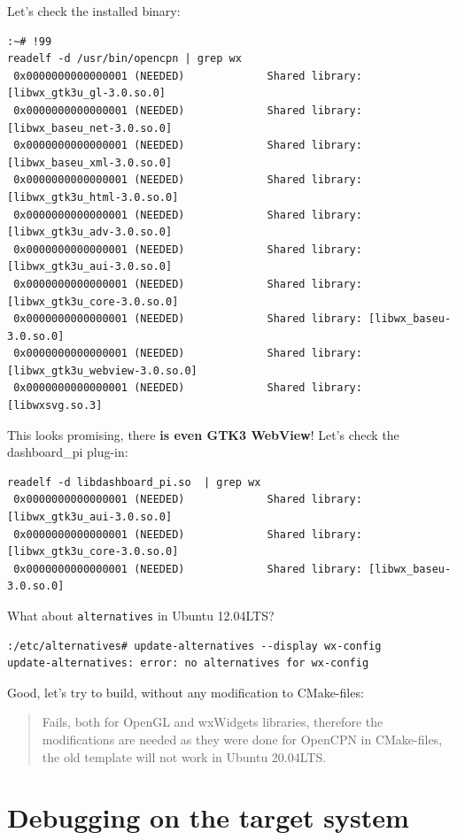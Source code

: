 \documentclass[11pt]{article}
\begin{document}
    Let's check the installed binary:

    \begin{verbatim}
:~# !99
readelf -d /usr/bin/opencpn | grep wx
 0x0000000000000001 (NEEDED)             Shared library: [libwx_gtk3u_gl-3.0.so.0]
 0x0000000000000001 (NEEDED)             Shared library: [libwx_baseu_net-3.0.so.0]
 0x0000000000000001 (NEEDED)             Shared library: [libwx_baseu_xml-3.0.so.0]
 0x0000000000000001 (NEEDED)             Shared library: [libwx_gtk3u_html-3.0.so.0]
 0x0000000000000001 (NEEDED)             Shared library: [libwx_gtk3u_adv-3.0.so.0]
 0x0000000000000001 (NEEDED)             Shared library: [libwx_gtk3u_aui-3.0.so.0]
 0x0000000000000001 (NEEDED)             Shared library: [libwx_gtk3u_core-3.0.so.0]
 0x0000000000000001 (NEEDED)             Shared library: [libwx_baseu-3.0.so.0]
 0x0000000000000001 (NEEDED)             Shared library: [libwx_gtk3u_webview-3.0.so.0]
 0x0000000000000001 (NEEDED)             Shared library: [libwxsvg.so.3]
\end{verbatim}

    This looks promising, there \textbf{is even GTK3 WebView}! Let's check
the dashboard\_pi plug-in:

    \begin{verbatim}
readelf -d libdashboard_pi.so  | grep wx
 0x0000000000000001 (NEEDED)             Shared library: [libwx_gtk3u_aui-3.0.so.0]
 0x0000000000000001 (NEEDED)             Shared library: [libwx_gtk3u_core-3.0.so.0]
 0x0000000000000001 (NEEDED)             Shared library: [libwx_baseu-3.0.so.0]
\end{verbatim}

    What about \texttt{alternatives} in Ubuntu 12.04LTS?

    \begin{verbatim}
:/etc/alternatives# update-alternatives --display wx-config
update-alternatives: error: no alternatives for wx-config
\end{verbatim}

    Good, let's try to build, without any modification to CMake-files:

    \begin{quote}
Fails, both for OpenGL and wxWidgets libraries, therefore the
modifications are needed as they were done for OpenCPN in CMake-files,
the old template will not work in Ubuntu 20.04LTS.
\end{quote}

    \hypertarget{debugging-on-the-target-system}{%
\section{Debugging on the target
system}\label{debugging-on-the-target-system}}
\end{document}
